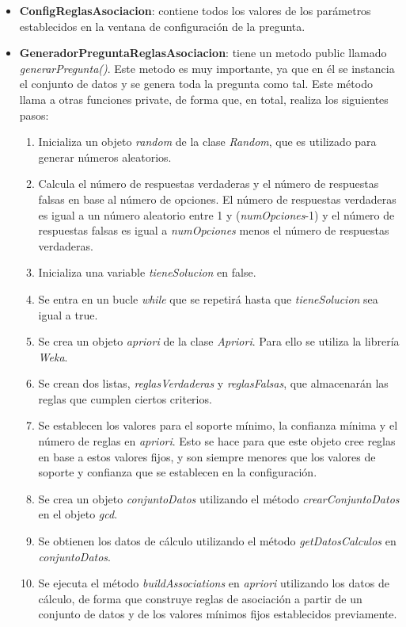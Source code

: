 \begin{itemize}
    \item \textbf{ConfigReglasAsociacion}: contiene todos los valores de los parámetros establecidos en la ventana de configuración de la pregunta. 
    \item \textbf{GeneradorPreguntaReglasAsociacion}: tiene un metodo public llamado \textit{generarPregunta()}. Este metodo es muy importante, ya que en él se instancia el conjunto de datos y se genera toda la pregunta como tal. Este método llama a otras funciones private, de forma que, en total, realiza los siguientes pasos:
    \begin{enumerate}
        \item Inicializa un objeto \textit{random} de la clase \textit{Random}, que es utilizado para generar números aleatorios.
        \item Calcula el número de respuestas verdaderas y el número de respuestas falsas en base al número de opciones. El número de respuestas verdaderas es igual a un número aleatorio entre 1 y (\textit{numOpciones}-1) y el número de respuestas falsas es igual a \textit{numOpciones} menos el número de respuestas verdaderas.
        \item Inicializa una variable \textit{tieneSolucion} en false.
        \item Se entra en un bucle \textit{while} que se repetirá hasta que \textit{tieneSolucion} sea igual a true.
        \item Se crea un objeto \textit{apriori} de la clase \textit{Apriori}. Para ello se utiliza la librería \textit{Weka}.
        \item Se crean dos listas, \textit{reglasVerdaderas} y \textit{reglasFalsas}, que almacenarán las reglas que cumplen ciertos criterios.
        \item Se establecen los valores para el soporte mínimo, la confianza mínima y el número de reglas en \textit{apriori}. Esto se hace para que este objeto cree reglas en base a estos valores fijos, y son siempre menores que los valores de soporte y confianza que se establecen en la configuración.
        \item Se crea un objeto \textit{conjuntoDatos} utilizando el método \textit{crearConjuntoDatos} en el objeto \textit{gcd}.
        \item Se obtienen los datos de cálculo utilizando el método \textit{getDatosCalculos} en \textit{conjuntoDatos}.
        \item Se ejecuta el método \textit{buildAssociations} en \textit{apriori} utilizando los datos de cálculo, de forma que construye reglas de asociación a partir de un conjunto de datos y de los valores mínimos fijos establecidos previamente.

\end{enumerate}
\end{itemize}
